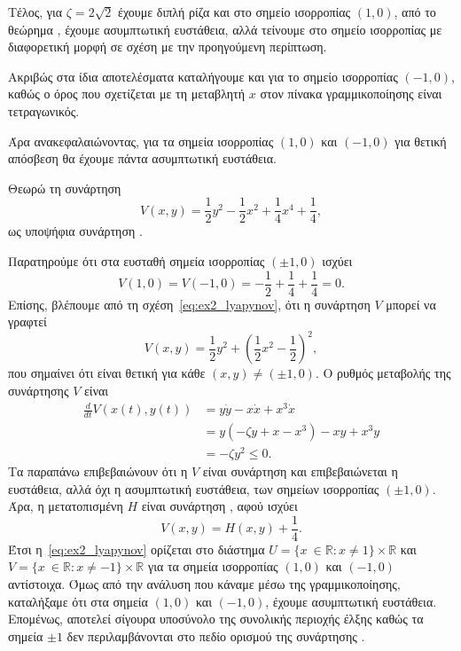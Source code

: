\begin{solution}
    Τέλος, για \( \zeta = 2\sqrt{2} \) έχουμε διπλή ρίζα και στο σημείο
    ισορροπίας \( (1, 0) \), από το θεώρημα , έχουμε
    ασυμπτωτική ευστάθεια, αλλά τείνουμε στο σημείο ισορροπίας με διαφορετική
    μορφή σε σχέση με την προηγούμενη περίπτωση.

    Ακριβώς στα ίδια αποτελέσματα καταλήγουμε και για το σημείο ισορροπίας
    \( (-1, 0) \), καθώς ο όρος που σχετίζεται με τη μεταβλητή \(x\) στον πίνακα
    γραμμικοποίησης είναι τετραγωνικός.

    Άρα ανακεφαλαιώνοντας, για τα σημεία ισορροπίας \( (1, 0) \) και \( (-1, 0)
    \) για θετική απόσβεση θα έχουμε πάντα ασυμπτωτική ευστάθεια.

    Θεωρώ τη συνάρτηση
    \begin{equation}\label{eq:ex2_lyapynov}
        V(x, y) = \frac{1}{2}y^2 - \frac{1}{2}x^2 + \frac{1}{4}x^4 +
        \frac{1}{4},
    \end{equation}
    ως υποψήφια συνάρτηση .

    Παρατηρούμε ότι στα ευσταθή σημεία ισορροπίας \( (\pm1, 0) \) ισχύει
    \begin{equation*}
        V(1, 0) =  V(-1, 0) = -\frac{1}{2} + \frac{1}{4} + \frac{1}{4} = 0.
    \end{equation*}
    Επίσης, βλέπουμε από τη σχέση~\eqref{eq:ex2_lyapynov}, ότι η συνάρτηση \( V \)
    μπορεί να γραφτεί
    \begin{equation*}
        V(x, y) = \frac{1}{2}y^2 + \left( \frac{1}{2}x^2 - \frac{1}{2} \right)^2,
    \end{equation*}
    που σημαίνει ότι είναι θετική για κάθε \( (x, y) \neq (\pm1, 0) \). Ο ρυθμός
    μεταβολής της συνάρτησης \( V \) είναι
    \begin{align*}
        \frac{d}{dt}V\left( x(t), y(t) \right) &= y\dot{y} - x\dot{x} +
        x^3\dot{x} \\
        &= y\left( -\zeta y + x - x^3 \right) - xy + x^3 y \\
        &= -\zeta y^2 \leq 0.
    \end{align*}
    Τα παραπάνω επιβεβαιώνουν ότι η \( V \) είναι συνάρτηση  και
    επιβεβαιώνεται η ευστάθεια, αλλά όχι η ασυμπτωτική ευστάθεια, των σημείων
    ισορροπίας \( (\pm1, 0) \). Άρα, η μετατοπισμένη \( H \) είναι συνάρτηση
    , αφού ισχύει
    \begin{equation*}
        V(x, y) = H(x, y) + \frac{1}{4}.
    \end{equation*}
    Έτσι η~\eqref{eq:ex2_lyapynov} ορίζεται στο διάστημα \( U = \{ x\ \in
    \mathbb{R}: x \neq 1 \}\times\mathbb{R} \) και \( V = \{ x\ \in
    \mathbb{R}: x \neq -1 \}\times\mathbb{R} \) για τα σημεία ισορροπίας \(
    (1, 0) \) και \( (-1, 0) \) αντίστοιχα. Όμως από την ανάλυση που
    κάναμε μέσω της γραμμικοποίησης, καταλήξαμε ότι στα σημεία \( (1, 0) \) και
    \( (-1, 0) \), έχουμε ασυμπτωτική ευστάθεια. Επομένως, αποτελεί σίγουρα
    υποσύνολο της συνολικής περιοχής έλξης καθώς τα σημεία \( \pm1 \)
    δεν περιλαμβάνονται στο πεδίο ορισμού της συνάρτησης .


\end{solution}
